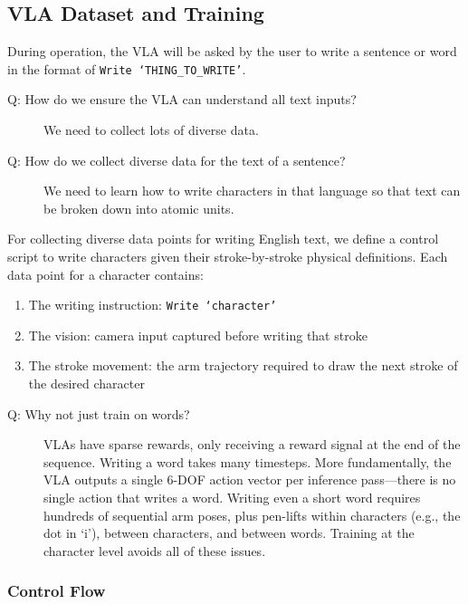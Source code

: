 \documentclass[12pt,a4paper]{article}
\begin{document}
\subsection{VLA Dataset and Training}

During operation, the VLA will be asked by the user to write a sentence or word in the format of \texttt{Write `THING\_TO\_WRITE'}.

\begin{description}
  \item[Q: How do we ensure the VLA can understand all text inputs?]
  We need to collect lots of diverse data.

  \item[Q: How do we collect diverse data for the text of a sentence?]
  We need to learn how to write characters in that language so that text can be broken down into atomic units.
\end{description}

For collecting diverse data points for writing English text, we define a control script to write characters given their stroke-by-stroke physical definitions. Each data point for a character contains:

\begin{enumerate}
  \item The writing instruction: \texttt{Write `character'}
  \item The vision: camera input captured before writing that stroke
  \item The stroke movement: the arm trajectory required to draw the next stroke of the desired character
\end{enumerate}

\begin{description}
  \item[Q: Why not just train on words?]
  VLAs have sparse rewards, only receiving a reward signal at the end of the sequence. Writing a word takes many timesteps. More fundamentally, the VLA outputs a single 6-DOF action vector per inference pass---there is no single action that writes a word. Writing even a short word requires hundreds of sequential arm poses, plus pen-lifts within characters (e.g., the dot in `i'), between characters, and between words. Training at the character level avoids all of these issues.
\end{description}

\subsubsection*{Control Flow}
\end{document}
